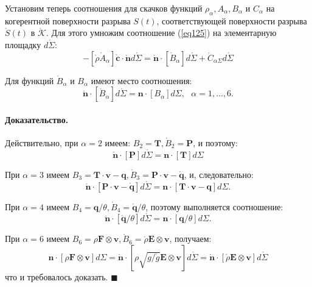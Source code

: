 
Установим теперь соотношения для скачков функций $\rho_\alpha, A_\alpha, B_\alpha$ и $C_\alpha$ на когерентной поверхности разрыва $S(t)$, соответствующей поверхности разрыва $\mathring{S}(t)$ в $\mathring{\mathcal{K}}$. Для этого умножим соотношение (\ref{eq125}) на элементарную площадку $d\mathring{\Sigma}$:
\begin{equation}\label{eq21}
-[\mathring{\rho}\mathring{A}_\alpha]\mathring{\mathbf{c}}\cdot\mathring{\mathbf{n}}d\mathring{\Sigma}=\mathring{\mathbf{n}}\cdot[\mathring{B}_\alpha]d\mathring{\Sigma}+\mathring{C}_{\alpha\Sigma}d\mathring{\Sigma}
\end{equation}

\begin{theorem}
	Для функций $\mathring{B}_\alpha$ и $B_\alpha$ имеют место соотношения:
	\begin{equation}
		\mathring{\mathbf{n}}\cdot[\mathring{B}_\alpha]d\mathring{\Sigma}=\mathbf{n}\cdot[B_\alpha]d\Sigma,~~~\alpha=1,\dots,6.
	\end{equation}
\end{theorem}
\paragraph{Доказательство.}
Действительно, при $\alpha=2$ имеем: $B_2=\mathbf{T}, \mathring{B}_2=\mathbf{P}$, и поэтому:
\[
	\mathring{\mathbf{n}}\cdot[\mathbf{P}]d\mathring{\Sigma}=\mathbf{n}\cdot[\mathbf{T}]d\Sigma
\]

При $\alpha=3$ имеем $B_3=\mathbf{T}\cdot\mathbf{v}-\mathbf{q}, \mathring{B}_3=\mathbf{P}\cdot\mathbf{v}-\mathring{\mathbf{q}}$, и, следовательно:
\[
\mathring{\mathbf{n}}\cdot[\mathbf{P}\cdot\mathbf{v}-\mathring{\mathbf{q}}]d\mathring{\Sigma}=\mathbf{n}\cdot[\mathbf{T}\cdot\mathbf{v}-\mathbf{q}]d\Sigma.
\]

При $\alpha=4$ имеем $B_4=\mathbf{q}/\theta,\mathring{B}_4=\mathring{\mathbf{q}}/\theta$, поэтому выполняется соотношение:
\[
\mathring{\mathbf{n}}\cdot[\mathring{\mathbf{q}}/\theta]d\mathring{\Sigma}=\mathbf{n}\cdot[\mathbf{q}/\theta]d\Sigma.
\]

При $\alpha=6$ имеем $B_6=\rho\mathbf{F}\otimes\mathbf{v},\mathring{B}_6=\mathring{\rho}\mathbf{E}\otimes\mathbf{v}$, получаем:
\[
\mathbf{n}\cdot[\rho\mathbf{F}\otimes\mathbf{v}]d\Sigma = \mathring{\mathbf{n}}\cdot[\rho\sqrt{g/\mathring{g}}\mathbf{E}\otimes\mathbf{v}]d\mathring{\Sigma}=\mathring{\mathbf{n}}\cdot[\mathring{\rho}\mathbf{E}\otimes\mathbf{v}]d\mathring{\Sigma}
\]
что и требовалось доказать. $\blacksquare$

